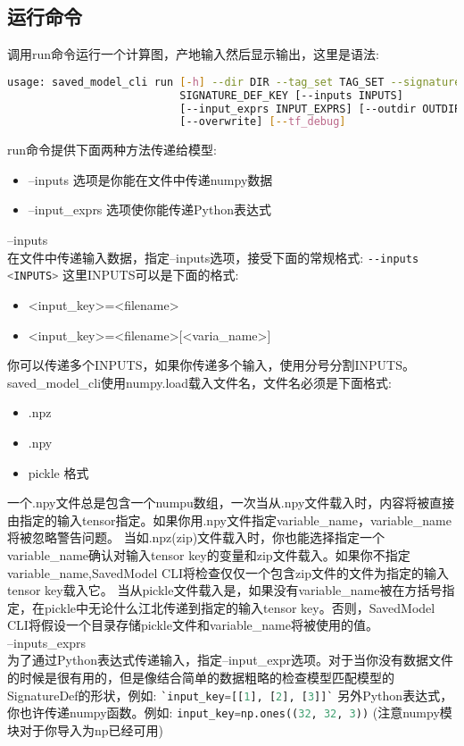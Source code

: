 \subsection{运行命令}
调用run命令运行一个计算图，产地输入然后显示输出，这里是语法:
\begin{lstlisting}[language=Bash]
usage: saved_model_cli run [-h] --dir DIR --tag_set TAG_SET --signature_def
                           SIGNATURE_DEF_KEY [--inputs INPUTS]
                           [--input_exprs INPUT_EXPRS] [--outdir OUTDIR]
                           [--overwrite] [--tf_debug]
\end{lstlisting}
run命令提供下面两种方法传递给模型:
\begin{itemize}
\item --inputs 选项是你能在文件中传递numpy数据
\item --input\_exprs 选项使你能传递Python表达式
\end{itemize}
--inputs\\
在文件中传递输入数据，指定--inputs选项，接受下面的常规格式:
\lstinline[language=Bash]{--inputs <INPUTS>}
这里INPUTS可以是下面的格式:
\begin{itemize}
\item <input\_key>=<filename> 
\item <input\_key>=<filename>[<varia\_name>]
\end{itemize}
你可以传递多个INPUTS，如果你传递多个输入，使用分号分割INPUTS。saved\_model\_cli使用numpy.load载入文件名，文件名必须是下面格式:
\begin{itemize}
\item .npz
\item .npy
\item pickle 格式
\end{itemize}
一个.npy文件总是包含一个numpu数组，一次当从.npy文件载入时，内容将被直接由指定的输入tensor指定。如果你用.npy文件指定variable\_name，variable\_name将被忽略警告问题。
当如.npz(zip)文件载入时，你也能选择指定一个variable\_name确认对输入tensor key的变量和zip文件载入。如果你不指定variable\_name,SavedModel CLI将检查仅仅一个包含zip文件的文件为指定的输入tensor key载入它。
当从pickle文件载入是，如果没有variable\_name被在方括号指定，在pickle中无论什么江北传递到指定的输入tensor key。否则，SavedModel CLI将假设一个目录存储pickle文件和variable\_name将被使用的值。\\
--inputs\_exprs\\
为了通过Python表达式传递输入，指定--input\_expr选项。对于当你没有数据文件的时候是很有用的，但是像结合简单的数据粗略的检查模型匹配模型的SignatureDef的形状，例如:
\lstinline[language=Python]{`input_key=[[1], [2], [3]]`}
另外Python表达式，你也许传递numpy函数。例如:
\lstinline[language=Python]{input_key=np.ones((32, 32, 3))}
(注意numpy模块对于你导入为np已经可用)
